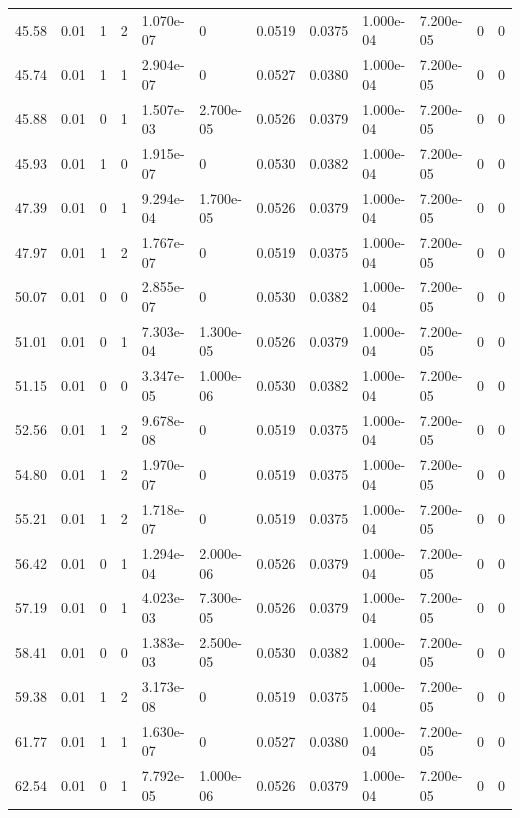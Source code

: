 \documentclass[preview]{standalone}
\begin{document}
{{{\begin{tabular}{L{1.2cm}C{1.2cm} C{0.3cm}C{0.5cm} C{1.4cm}C{1.4cm} C{1.4cm}C{1.4cm} C{1.6cm}C{1.6cm} C{1.6cm}C{1.6cm}}
  45.58  &  0.01  & 1     &  2 &  1.070e-07  & 0  &  0.0519&   0.0375& 1.000e-04 & 7.200e-05   &  0 & 0  \\ 
  45.74  &  0.01  & 1     &  1 &  2.904e-07  & 0  &  0.0527&   0.0380& 1.000e-04 & 7.200e-05   &  0 & 0  \\ 
  45.88  &  0.01  & 0     &  1 &  1.507e-03  & 2.700e-05  &  0.0526&   0.0379& 1.000e-04 & 7.200e-05   &  0 & 0  \\ 
  45.93  &  0.01  & 1     &  0 &  1.915e-07  & 0  &  0.0530&   0.0382& 1.000e-04 & 7.200e-05   &  0 & 0  \\ 
  47.39  &  0.01  & 0     &  1 &  9.294e-04  & 1.700e-05  &  0.0526&   0.0379& 1.000e-04 & 7.200e-05   &  0 & 0  \\ 
  47.97  &  0.01  & 1     &  2 &  1.767e-07  & 0  &  0.0519&   0.0375& 1.000e-04 & 7.200e-05   &  0 & 0  \\ 
  50.07  &  0.01  & 0     &  0 &  2.855e-07  & 0  &  0.0530&   0.0382& 1.000e-04 & 7.200e-05   &  0 & 0  \\ 
  51.01  &  0.01  & 0     &  1 &  7.303e-04  & 1.300e-05  &  0.0526&   0.0379& 1.000e-04 & 7.200e-05   &  0 & 0  \\ 
  51.15  &  0.01  & 0     &  0 &  3.347e-05  & 1.000e-06  &  0.0530&   0.0382& 1.000e-04 & 7.200e-05   &  0 & 0  \\ 
  52.56  &  0.01  & 1     &  2 &  9.678e-08  & 0  &  0.0519&   0.0375& 1.000e-04 & 7.200e-05   &  0 & 0  \\ 
  54.80  &  0.01  & 1     &  2 &  1.970e-07  & 0  &  0.0519&   0.0375& 1.000e-04 & 7.200e-05   &  0 & 0  \\ 
  55.21  &  0.01  & 1     &  2 &  1.718e-07  & 0  &  0.0519&   0.0375& 1.000e-04 & 7.200e-05   &  0 & 0  \\ 
  56.42  &  0.01  & 0     &  1 &  1.294e-04  & 2.000e-06  &  0.0526&   0.0379& 1.000e-04 & 7.200e-05   &  0 & 0  \\ 
  57.19  &  0.01  & 0     &  1 &  4.023e-03  & 7.300e-05  &  0.0526&   0.0379& 1.000e-04 & 7.200e-05   &  0 & 0  \\ 
  58.41  &  0.01  & 0     &  0 &  1.383e-03  & 2.500e-05  &  0.0530&   0.0382& 1.000e-04 & 7.200e-05   &  0 & 0  \\ 
  59.38  &  0.01  & 1     &  2 &  3.173e-08  & 0  &  0.0519&   0.0375& 1.000e-04 & 7.200e-05   &  0 & 0  \\ 
  61.77  &  0.01  & 1     &  1 &  1.630e-07  & 0  &  0.0527&   0.0380& 1.000e-04 & 7.200e-05   &  0 & 0  \\ 
  62.54  &  0.01  & 0     &  1 &  7.792e-05  & 1.000e-06  &  0.0526&   0.0379& 1.000e-04 & 7.200e-05   &  0 & 0  \\ 

\end{tabular}}}}
\end{document}
